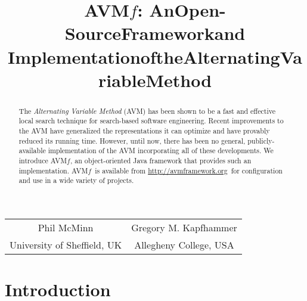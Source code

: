 \documentclass{llncs}
\newcommand{\AVM}{Alternating Variable Method\xspace}
\newcommand{\name}{\mbox{AVM\hspace{-1pt}$f$}\xspace}
\newcommand{\repourl}{\url{http://avmframework.org}\xspace}
\begin{document}
\title{\texorpdfstring{\name: An\:Open-Source\:Framework\:and\\$\!$$\!$$\!$Implementation\:of\:the\:Alternating\:Variable\:Method\vspace{-.75em}}{}}
\author{} %
\institute{} %
\maketitle

\vspace{-2em}
\begin{center}
\begin{tabular}{c@{\hskip 3em}c}
    Phil McMinn & Gregory M. Kapfhammer \\
    {\small University of Sheffield, UK} & {\small Allegheny College, USA} \\
\end{tabular}
\end{center}
\vspace{-2em}

\begin{abstract}
The {\it \AVM\/} (AVM) has been shown to be a fast and effective local search technique for %
search-based software engineering.
%
Recent improvements to the AVM have generalized the
representations it can optimize and have provably reduced its running time.
However, until now, there has been no general, publicly-available
implementation of the AVM
incorporating
all of these developments.
We introduce \name, an object-oriented
Java framework
that provides
such an implementation. \name~is available from \repourl~for configuration and use in a wide variety of projects.\vspace{-1ex}
\end{abstract}

\vspace{-2.5em}
\section{Introduction}
\vspace{-1em}

\end{document}
